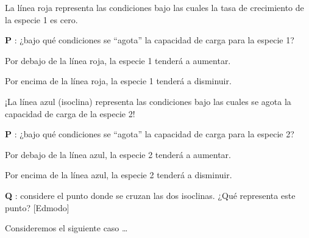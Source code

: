 \documentclass[
]{article}
\begin{document}
La línea roja representa las condiciones bajo las cuales la tasa de
crecimiento de la especie 1 es cero.

\textbf{P }: ¿bajo qué condiciones se ``agota'' la capacidad de carga
para la especie 1?

Por debajo de la línea roja, la especie 1 tenderá a aumentar.

Por encima de la línea roja, la especie 1 tenderá a disminuir.

¡La línea azul (isoclina) representa las condiciones bajo las cuales se
agota la capacidad de carga de la especie 2!

\textbf{P }: ¿bajo qué condiciones se ``agota'' la capacidad de carga
para la especie 2?

Por debajo de la línea azul, la especie 2 tenderá a aumentar.

Por encima de la línea azul, la especie 2 tenderá a disminuir.

\textbf{Q }: considere el punto donde se cruzan las dos isoclinas. ¿Qué
representa este punto? {[}Edmodo{]}

Consideremos el siguiente caso \ldots{}
\end{document}
